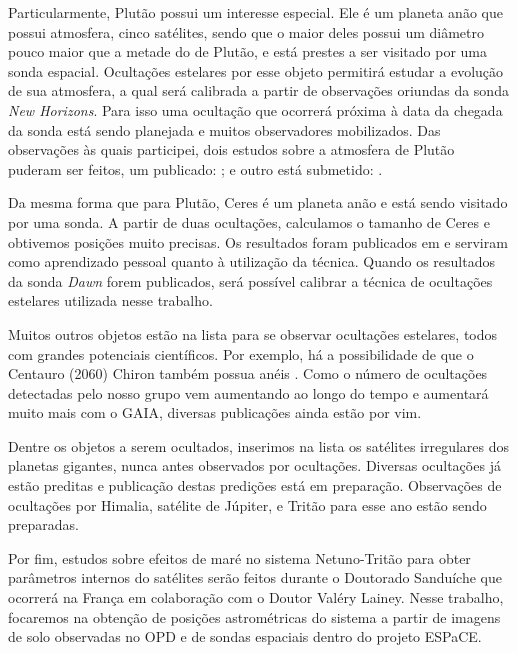 \documentclass[12pt,a4paper]{monografia}
\begin{document}
Particularmente, Plutão possui um interesse especial. Ele é um planeta anão que possui atmosfera, cinco satélites, sendo que o maior deles possui um diâmetro pouco maior que a metade do de Plutão, e está prestes a ser visitado por uma sonda espacial. Ocultações estelares por esse objeto permitirá estudar a evolução de sua atmosfera, a qual será calibrada a partir de observações oriundas da sonda \textit{New Horizons}. Para isso uma ocultação que ocorrerá próxima à data da chegada da sonda está sendo planejada e muitos observadores mobilizados. Das observações às quais participei, dois estudos sobre a atmosfera de Plutão puderam ser feitos, um publicado: \cite{Olkin2015}; e outro está submetido: \cite{DiasOliveira2015}.

Da mesma forma que para Plutão, Ceres é um planeta anão e está sendo visitado por uma sonda. A partir de duas ocultações, calculamos o tamanho de Ceres e obtivemos posições muito precisas. Os resultados foram publicados em \cite{GomesJunior2015-Ceres} e serviram como aprendizado pessoal quanto à utilização da técnica. Quando os resultados da sonda \textit{Dawn} forem publicados, será possível calibrar a técnica de ocultações estelares utilizada nesse trabalho.

Muitos outros objetos estão na lista para se observar ocultações estelares, todos com grandes potenciais científicos. Por exemplo, há a possibilidade de que o Centauro (2060) Chiron também possua anéis \citep{Ruprecht2015}. Como o número de ocultações detectadas pelo nosso grupo vem aumentando ao longo do tempo e aumentará muito mais com o GAIA, diversas publicações ainda estão por vim.

Dentre os objetos a serem ocultados, inserimos na lista os satélites irregulares dos planetas gigantes, nunca antes observados por ocultações. Diversas ocultações já estão preditas e publicação destas predições está em preparação. Observações de ocultações por Himalia, satélite de Júpiter, e Tritão para esse ano estão sendo preparadas.

Por fim, estudos sobre efeitos de maré no sistema Netuno-Tritão para obter parâmetros internos do satélites serão feitos durante o Doutorado Sanduíche que ocorrerá na França em colaboração com o Doutor Valéry Lainey. Nesse trabalho, focaremos na obtenção de posições astrométricas do sistema a partir de imagens de solo observadas no OPD e de sondas espaciais dentro do projeto ESPaCE.




\end{document}
